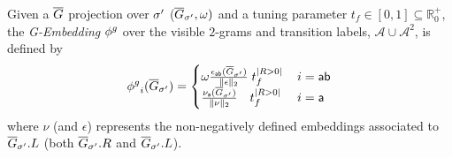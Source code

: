 {{%
\begin{definition}[G-Embedding]\label{def:ppne}
Given a $\overline{G}$ projection over ${\sigma'}$ ($\overline{G}_{\sigma'},\omega)$ and a tuning parameter $t_f\in[0,1]\subseteq\mathbb{R}^+_{0}$, the \emph{G-Embedding} ${\phi^{g}}$ over the visible $2$-grams and transition labels, $\mathcal{A}\cup\mathcal{A}^2$, is defined by
$${\phi^{g}}_{i}(\overline{G}_{\sigma'})=\begin{cases}
	\omega \frac{\epsilon_{\mathsf{ab}}(\overline{G}_{\sigma'})}{\|\epsilon\|_2}\;t_f^{|R>0|}\, & {i}=\mathsf{ab}\\
	\frac{\nu_{\mathsf{a}}(\overline{G}_{\sigma'})}{\|\nu\|_2}\;\;\;\,t_f^{|R>0|}\, & {i}=\mathsf{a}\\
\end{cases}$$
where $\nu$ (and $\epsilon$) represents the non-negatively defined embeddings associated to $\overline{G}_{\sigma'}.L$ (both $\overline{G}_{\sigma'}.R$ and $\overline{G}_{\sigma'}.L$).
\end{definition}
}}
